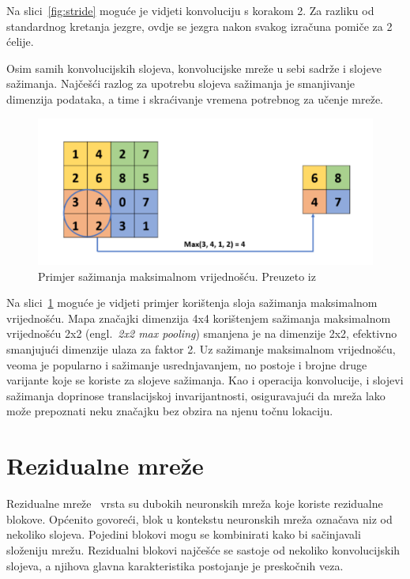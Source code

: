 \documentclass[times, utf8, zavrsni, numeric]{fer}
\begin{document}
Na slici~\ref{fig:stride} moguće je vidjeti konvoluciju s korakom 2. Za razliku od standardnog kretanja jezgre, ovdje se jezgra nakon svakog izračuna pomiče za 2 ćelije. 

Osim samih konvolucijskih slojeva, konvolucijske mreže u sebi sadrže i slojeve sažimanja. 
Najčešći razlog za upotrebu slojeva sažimanja je smanjivanje dimenzija podataka, a time i skraćivanje vremena potrebnog za učenje mreže.

\begin{figure}[htb]
    \centering
    \includegraphics[scale=0.35]{maxpool.png}
    \caption{Primjer sažimanja maksimalnom vrijednošću. Preuzeto iz \cite{gholamalinezhad2020pooling}}
    \label{fig:maxpool}
\end{figure}

Na slici~\ref{fig:maxpool} moguće je vidjeti primjer korištenja sloja sažimanja maksimalnom vrijednošću.
Mapa značajki dimenzija 4x4 korištenjem sažimanja maksimalnom vrijednošću 2x2 (engl.\ \textit{2x2 max pooling}) smanjena je na dimenzije 2x2, efektivno smanjujući dimenzije ulaza za faktor 2.
Uz sažimanje maksimalnom vrijednošću, veoma je popularno i sažimanje usrednjavanjem, no postoje i brojne druge varijante koje se koriste za slojeve sažimanja.
Kao i operacija konvolucije, i slojevi sažimanja doprinose translacijskoj invarijantnosti, osiguravajući da mreža lako može prepoznati neku značajku bez obzira na njenu točnu lokaciju.

\section{Rezidualne mreže}

Rezidualne mreže~\cite{he2016deep} vrsta su dubokih neuronskih mreža koje koriste rezidualne blokove. Općenito govoreći, blok u kontekstu neuronskih mreža označava niz od nekoliko slojeva. 
Pojedini blokovi mogu se kombinirati kako bi sačinjavali složeniju mrežu. 
Rezidualni blokovi najčešće se sastoje od nekoliko konvolucijskih slojeva, a njihova glavna karakteristika postojanje je preskočnih veza.
\end{document}

